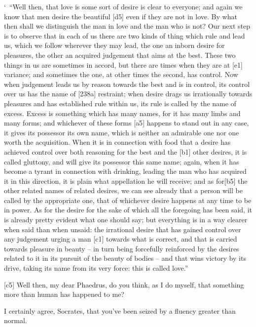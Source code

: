 ‘~“Well then, that love is some sort of
desire is clear to
everyone; and again we know that men desire the
beautiful {[}d5{]} even
if they are not in love. By what then shall we distinguish the man in
love and the man who is not? Our next step is to observe that in each of
us there are two kinds of thing which rule and lead us, which we follow
wherever they may lead, the one an inborn desire for pleasures, the
other an acquired judgement that aims at the best. These two things in
us are sometimes in accord, but there are times when they are at
{[}e1{]} variance; and sometimes the one, at other times the second, has
control. Now when judgement leads us by reason towards the best and is
in control, its control over us has the name of {[}238a{]}
restraint; when desire
drags us irrationally towards pleasures and has established rule within
us, its rule is called by the name of
excess. Excess is
something which has many names, for it has many limbs and many forms;
and whichever of these forms {[}a5{]} happens to stand out in any case,
it gives its possessor its own name, which is neither an admirable one
nor one worth the acquisition. When it is in connection with food that a
desire has achieved control over both reasoning for the best and the
{[}b1{]} other desires, it is called gluttony, and will give its
possessor this same name; again, when it has become a tyrant in
connection with drinking, leading the man who has acquired it in this
direction, it is plain what appellation he will receive; and as
for{[}b5{]} the other related names of related desires, we can see
already that a person will be called by the appropriate one, that of
whichever desire happens at any time to be in power. As for the desire
for the sake of which all the foregoing has been said, it is already
pretty evident what one should say; but everything is in a way clearer
when said than when unsaid: the irrational desire that has gained
control over any judgement urging a man {[}c1{]} towards what is
correct, and that is carried towards pleasure in beauty -- in turn being
forcefully reinforced by the desires related to it in its pursuit of the
beauty of bodies -- and that wins victory by its drive, taking its name
from its very force: this is called
love.”

{[}c5{]} Well then, my dear Phaedrus, do you think, as I do myself, that
something more than
human has happened to
me?

 I certainly agree, Socrates, that you've been seized by a
fluency greater than normal.

